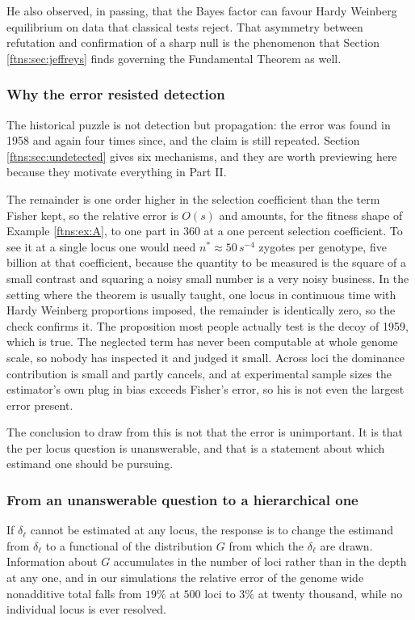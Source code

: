 He also observed, in passing, that the Bayes factor can favour Hardy Weinberg equilibrium on data
that classical tests reject. That asymmetry between refutation and confirmation of a sharp null is
the phenomenon that Section \ref{ftns:sec:jeffreys} finds governing the Fundamental Theorem as well.

\subsubsection{Why the error resisted detection}

The historical puzzle is not detection but propagation: the error was found in 1958 and again four
times since, and the claim is still repeated. Section \ref{ftns:sec:undetected} gives six mechanisms,
and they are worth previewing here because they motivate everything in Part II.

The remainder is one order higher in the selection coefficient than the term Fisher kept, so the
relative error is $O(s)$ and amounts, for the fitness shape of Example \ref{ftns:ex:A}, to one part in $360$ at a one percent selection coefficient.
To see it at a single locus one would need $n^\ast\approx50\,s^{-4}$ zygotes per genotype, five
billion at that coefficient, because the quantity to be measured is the square of a small contrast
and squaring a noisy small number is a very noisy business. In the setting where the theorem is
usually taught, one locus in continuous time with Hardy Weinberg proportions imposed, the
remainder is identically zero, so the check confirms it. The proposition most people actually test
is the decoy of 1959, which is true. The neglected term has never been computable at whole genome
scale, so nobody has inspected it and judged it small. Across loci the dominance contribution is small and partly cancels, and at experimental sample sizes the
estimator's own plug in bias exceeds Fisher's error, so his is not even the largest error present.

The conclusion to draw from this is not that the error is unimportant. It is that the per locus
question is unanswerable, and that is a statement about which estimand one should be pursuing.

\subsubsection{From an unanswerable question to a hierarchical one}

If $\delta_\ell$ cannot be estimated at any locus, the response is to change the estimand from
$\delta_\ell$ to a functional of the distribution $G$ from which the $\delta_\ell$ are drawn.
Information about $G$ accumulates in the number of loci rather than in the depth at any one, and in
our simulations the relative error of the genome wide nonadditive total falls from $19\%$ at $500$
loci to $3\%$ at twenty thousand, while no individual locus is ever resolved.

